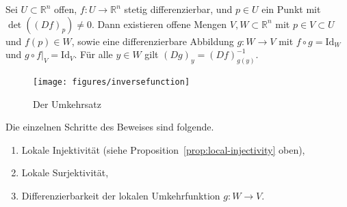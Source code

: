 \documentclass[../main.tex]{subfiles}
\begin{document}
\begin{theorem}[Umkehrsatz]
  Sei $U \subset \mathbb{R}^n$ offen, $f \colon U \to \mathbb{R}^n$ 
  stetig differenzierbar, und $p \in U$ ein Punkt mit
  $\det( {(Df)}_p ) \neq 0$.
  Dann existieren offene Mengen $V, W \subset \mathbb{R}^n$
  mit 
  $p \in V \subset U$ und
  $f(p) \in W$,
  sowie eine differenzierbare Abbildung $g \colon W \to V$ mit
  $f \circ g = \text{Id}_W$ und $g \circ f|_V = \text{Id}_V$.
  Für alle $y \in W$ gilt ${(Dg)}_y = {(Df)}_{g(y)}^{-1}$.
\end{theorem}

\begin{figure}[htb]
  \centering
  \texttt{[image: figures/inversefunction]}
  \caption{Der Umkehrsatz}%
  \label{fig:inversefunction}
\end{figure}

Die einzelnen Schritte des Beweises sind folgende.
\begin{enumerate}[(1)]
  \item Lokale Injektivität (siehe 
    Proposition~\ref{prop:local-injectivity} oben),
  \item Lokale Surjektivität,
  \item Differenzierbarkeit der lokalen Umkehrfunktion $g \colon W \to V$.
\end{enumerate}
\end{document}
